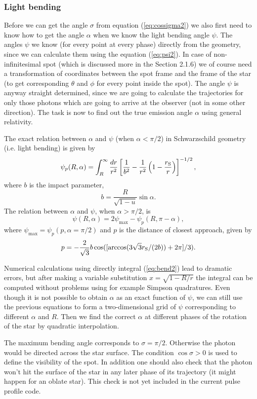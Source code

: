 \documentclass{wihuri}
\def\rg{r_{\rm S}} %
\def\be{\begin{equation}}
\def\ee{\end{equation}}
\def\rg{r_{\rm S}} %
\begin{document}
\subsubsection{Light bending}

Before we can get the angle $\sigma$ from equation (\ref{eq:cossigma2}) we also first need to know how to get the angle $\alpha$ when we know the light bending angle $\psi$. The angles $\psi$ we know (for every point at every phase) directly from the geometry, since we can calculate them using the equation (\ref{eq:psi2}). In case of non-infinitesimal spot (which is discussed more in the Section 2.1.6) we of course need a  transformation of coordinates between the spot frame and the frame of the star (to get corresponding $\theta$ and $\phi$ for every point inside the spot). The angle $\psi$ is anyway straight determined, since we are going to calculate the trajectories for only those photons which are going to arrive at the observer (not in some other direction). The task is now to find out the true emission angle $\alpha$ using general relativity. 

The exact relation between $\alpha$ and $\psi$ (when $\alpha < \pi/2$) in Schwarzschild geometry (i.e. light bending) is given by \cite{mtw}%
\be \label{eq:bend2}
  \psi_{p}(R,\alpha)=\int_R^{\infty} \frac{dr}{r^2} \left[ \frac{1}{b^2} -
       \frac{1}{r^2}\left( 1- \frac{\rg}{r}\right)\right]^{-1/2} ,
\ee
where $b$ is the impact parameter,
\be \label{eq:impact2}
  b=\frac{R}{\sqrt{1-u}} \sin\alpha .
\ee
The relation between  $\alpha$ and $\psi$, when $\alpha > \pi/2$, is 
\be 
\psi(R,\alpha)=2\psi_{\max}-\psi_{p}(R,\pi-\alpha),
\ee 
where $\psi_{\max} = \psi_{p}(p,\alpha=\pi/2)$ and $p$ is the distance of closest approach, given by
\be
p = -\frac{2}{\sqrt{3}}b\cos([\arccos(3\sqrt{3}\rg/(2b))+2\pi]/3).
\ee


Numerical calculations using directly integral (\ref{eq:bend2}) lead to dramatic errors, but after making a variable substitution $x = \sqrt{1-R/r}$ the integral can be computed without problems using for example Simpson quadratures. Even though it is not possible to obtain $\alpha$ as an exact function of $\psi$, we can still use the previous equations to form a two-dimensional grid of $\psi$ corresponding to different $\alpha$ and $R$. Then we find the correct $\alpha$ at different phases of the rotation of the star by quadratic interpolation. 



The maximum bending angle corresponds to $\sigma=\pi/2$. Otherwise the photon would be directed across the star surface. 
The condition $\cos \sigma>0$ is used to define the visibility of the spot. In addition one should also check that the photon won't hit the surface of the star in any later phase of its trajectory (it might happen for an oblate star). This check is not yet included in the current pulse profile code.
\end{document}
